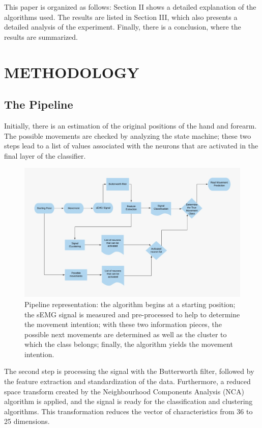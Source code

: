 \documentclass[letterpaper, 10 pt, conference]{ieeeconf}  %
\begin{document}
This paper is organized as follows: Section II shows a detailed explanation of the algorithms used. The results are listed in Section III, which also presents a detailed analysis of the experiment. Finally, there is a conclusion, where the results are summarized.

\section{METHODOLOGY}

\subsection{The Pipeline}

Initially, there is an estimation of the original positions of the hand and forearm. The possible movements are checked by analyzing the state machine; these two steps lead to a list of values associated with the neurons that are activated in the final layer of the classifier.

\begin{figure}[h]
    \begin{center}
	\includegraphics[width=.8\linewidth]{images/sMEG_Classification_Fluxogram.png}
	\end{center}
	\caption{Pipeline representation: the algorithm begins at a starting position; the sEMG signal is measured and pre-processed to help to determine the movement intention; with these two information pieces, the possible next movements are determined as well as the cluster to which the class belongs; finally, the algorithm yields the movement intention.} \label{fig_class_fluxo}
\end{figure}

The second step is processing the signal with the Butterworth filter, followed by the feature extraction and standardization of the data. Furthermore, a reduced space transform created by the Neighbourhood Components Analysis (NCA) algorithm is applied, and the signal is ready for the classification and clustering algorithms. This transformation reduces the vector of characteristics from 36 to 25 dimensions.
\end{document}
